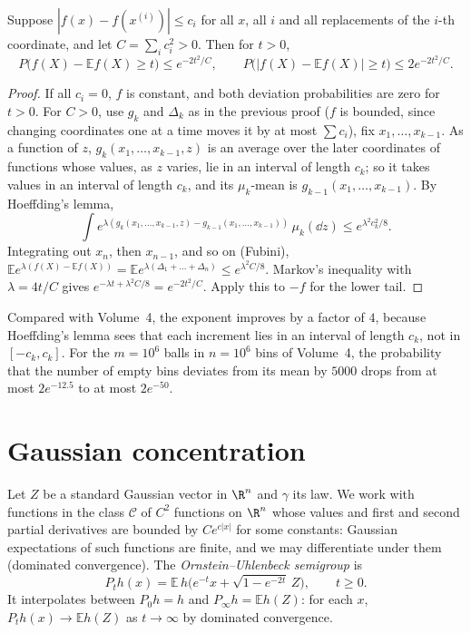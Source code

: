 \begin{theorem}[McDiarmid]\label{thm:mcdiarmid}
Suppose $|f(x)-f(x^{(i)})|\le c_i$ for all $x$, all $i$ and all replacements of the $i$-th coordinate, and let $C=\sum_ic_i^2>0$. Then for $t>0$,
\[
P\bigl(f(X)-\mathbb Ef(X)\ge t\bigr)\le e^{-2t^2/C},\qquad P\bigl(|f(X)-\mathbb Ef(X)|\ge t\bigr)\le2e^{-2t^2/C}.
\]
\end{theorem}
\begin{proof}
If all $c_i=0$, $f$ is constant, and both deviation probabilities are zero for $t>0$. For $C>0$, use $g_k$ and $\Delta_k$ as in the previous proof ($f$ is bounded, since changing coordinates one at a time moves it by at most $\sum c_i$), fix $x_1,\dots,x_{k-1}$. As a
function of $z$, $g_k(x_1,\dots,x_{k-1},z)$ is an average over the later coordinates of functions whose values, as $z$ varies, lie in an interval of length $c_k$; so it
takes values in an interval of length $c_k$, and its $\mu_k$-mean is $g_{k-1}(x_1,\dots,x_{k-1})$. By Hoeffding's lemma,
\[
\int e^{\lambda(g_k(x_1,\dots,x_{k-1},z)-g_{k-1}(x_1,\dots,x_{k-1}))}\,\mu_k(\dd z)\le e^{\lambda^2c_k^2/8}.
\]
Integrating out $x_n$, then $x_{n-1}$, and so on (Fubini), $\mathbb Ee^{\lambda(f(X)-\mathbb Ef(X))}=\mathbb Ee^{\lambda(\Delta_1+\dots+\Delta_n)}\le e^{\lambda^2C/8}$. Markov's inequality with
$\lambda=4t/C$ gives $e^{-\lambda t+\lambda^2C/8}=e^{-2t^2/C}$. Apply this to $-f$ for the lower tail.
\end{proof}

Compared with Volume~4, the exponent improves by a factor of $4$, because Hoeffding's lemma sees that each increment lies in an interval of length $c_k$, not in
$[-c_k,c_k]$. For the $m=10^6$ balls in $n=10^6$ bins of Volume~4, the probability that the number of empty bins deviates from its mean by $5000$ drops from at most
$2e^{-12.5}$ to at most $2e^{-50}$.

\section{Gaussian concentration}

Let $Z$ be a standard Gaussian vector in $\R^n$ and $\gamma$ its law. We work with functions in the class $\mathcal C$ of $C^2$ functions on $\R^n$ whose values and first and
second partial derivatives are bounded by $Ce^{c|x|}$ for some constants: Gaussian expectations of such functions are finite, and we may differentiate under them
(dominated convergence). The \emph{Ornstein--Uhlenbeck semigroup} is
\[
P_th(x)=\mathbb E\,h\bigl(e^{-t}x+\sqrt{1-e^{-2t}}\,Z\bigr),\qquad t\ge0.
\]
It interpolates between $P_0h=h$ and $P_\infty h=\mathbb Eh(Z)$: for each $x$, $P_th(x)\to\mathbb Eh(Z)$ as $t\to\infty$ by dominated convergence.

